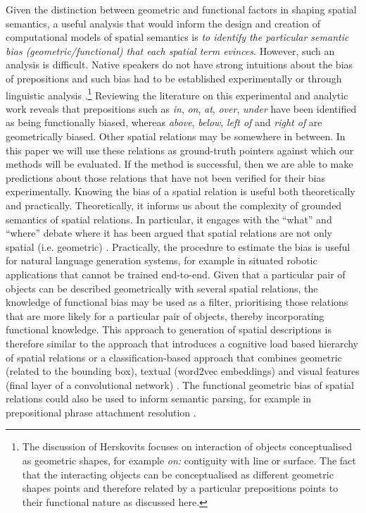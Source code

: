 Given the distinction between geometric and functional
factors in shaping spatial semantics, a useful analysis that
would inform the design and creation of computational models of spatial
semantics is \emph{to identify the particular semantic bias
(geometric/functional) that each spatial term evinces}. However, such an analysis is difficult. Native speakers do not have strong intuitions about the bias of
prepositions and such bias had to be established experimentally
\cite{CoventryEtAl:2001,Garrod:1999fk} or through linguistic analysis
\cite[p.55]{herskovits1986language}.\footnote{The discussion of Herskovits
  focuses on interaction of objects conceptualised as geometric
  shapes, for example \emph{on:} contiguity with line or surface. The
  fact that the interacting objects can be conceptualised as different
  geometric shapes points and therefore related by a particular
  prepositions points to their functional nature as discussed here.}
Reviewing the literature on this experimental and analytic work reveals
that prepositions such as \emph{in}, \emph{on}, \emph{at}, \emph{over}, \emph{under}
have been identified as being functionally biased, whereas \emph{above}, \emph{below}, \emph{left of} and \emph{right of} are geometrically biased. Other spatial
relations may be somewhere in between. In this paper we will use these relations as ground-truth pointers against which our methods will be evaluated. If the method is successful, then we are able to make predictions about those relations that have not been verified for their bias experimentally. Knowing the bias of a spatial relation is useful both theoretically and practically. Theoretically, it informs us about the complexity of grounded semantics of spatial relations. In particular, it engages with the ``what'' and ``where'' debate where it has been argued that spatial relations are not only spatial (i.e. geometric) \cite{Landau:1993aa,Coventry:2004aa,Landau:2016aa}. Practically, the procedure to estimate the bias is useful for natural language generation systems, for example in situated robotic applications that cannot be trained end-to-end. Given that a particular pair of objects can be described geometrically with several spatial relations, the knowledge of functional bias may be used as a filter, prioritising those relations that are more likely for a particular pair of objects, thereby incorporating functional knowledge. This approach to generation of spatial descriptions is therefore similar to the approach that introduces a cognitive load based hierarchy of spatial relations \cite{Kelleher:2006} or a classification-based approach that combines geometric (related to the bounding box), textual (word2vec embeddings) and visual features (final layer of a convolutional network) \cite{Ramisa:2015aa}. The functional geometric bias of spatial relations could also be used to inform semantic parsing, for example in prepositional phrase attachment resolution \cite{Christie:2016aa,Delecraz:2017aa}.

